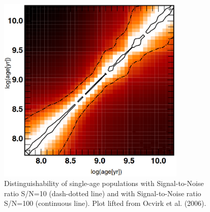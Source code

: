 \begin{figure}
\includegraphics[width = 0.8\textwidth]{figures/Ocvirck.png}
  \caption{Distinguishability of single-age populations with Signal-to-Noise ratio S/N=10 (dash-dotted line) and with Signal-to-Noise ratio S/N=100 (continuous line). Plot lifted from Ocvirk et al. (2006)\cite{Ocvirk2006}. }
  \label{fig:Ocvi}
\end{figure}
